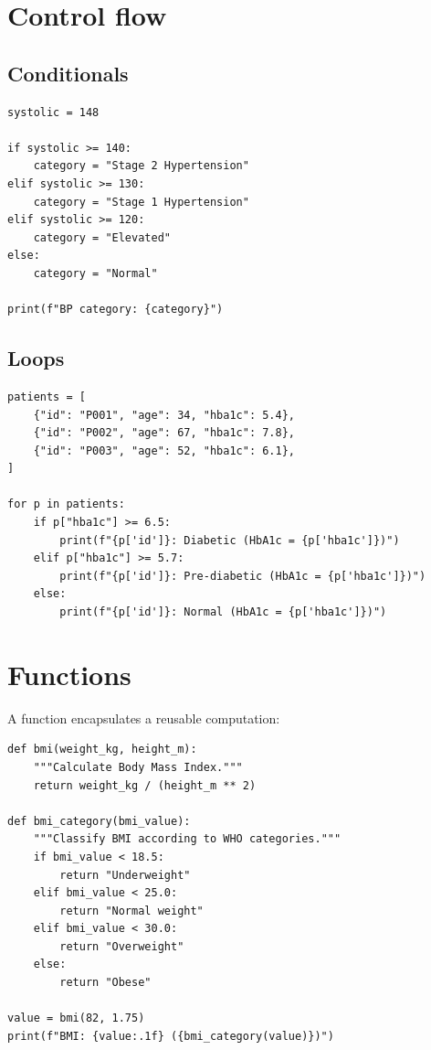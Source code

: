 \section{Control flow}

\subsection{Conditionals}

\begin{verbatim}
systolic = 148

if systolic >= 140:
    category = "Stage 2 Hypertension"
elif systolic >= 130:
    category = "Stage 1 Hypertension"
elif systolic >= 120:
    category = "Elevated"
else:
    category = "Normal"

print(f"BP category: {category}")
\end{verbatim}

\subsection{Loops}

\begin{verbatim}
patients = [
    {"id": "P001", "age": 34, "hba1c": 5.4},
    {"id": "P002", "age": 67, "hba1c": 7.8},
    {"id": "P003", "age": 52, "hba1c": 6.1},
]

for p in patients:
    if p["hba1c"] >= 6.5:
        print(f"{p['id']}: Diabetic (HbA1c = {p['hba1c']})")
    elif p["hba1c"] >= 5.7:
        print(f"{p['id']}: Pre-diabetic (HbA1c = {p['hba1c']})")
    else:
        print(f"{p['id']}: Normal (HbA1c = {p['hba1c']})")
\end{verbatim}

\section{Functions}

A function encapsulates a reusable computation:

\begin{verbatim}
def bmi(weight_kg, height_m):
    """Calculate Body Mass Index."""
    return weight_kg / (height_m ** 2)

def bmi_category(bmi_value):
    """Classify BMI according to WHO categories."""
    if bmi_value < 18.5:
        return "Underweight"
    elif bmi_value < 25.0:
        return "Normal weight"
    elif bmi_value < 30.0:
        return "Overweight"
    else:
        return "Obese"

value = bmi(82, 1.75)
print(f"BMI: {value:.1f} ({bmi_category(value)})")
\end{verbatim}

